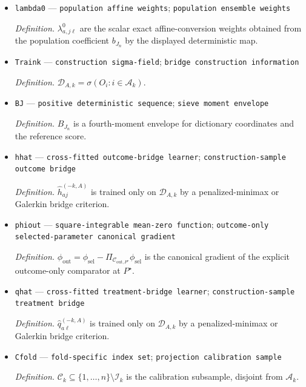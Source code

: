 \documentclass{article}
\begin{document}
\begin{itemize}
  \item \texttt{lambda0} --- \texttt{population affine weights}; \texttt{population ensemble weights}
  \par\smallskip\noindent\emph{Definition.} \(\lambda^0_{a,j\ell}\) are the scalar exact affine-conversion weights obtained from the population coefficient \(b_{J_n}\) by the displayed deterministic map.
  \item \texttt{Traink} --- \texttt{construction sigma-\allowbreak{}field}; \texttt{bridge construction information}
  \par\smallskip\noindent\emph{Definition.} \(\mathcal D_{A,k}=\sigma(O_i:i\in\mathcal A_k)\).
  \item \texttt{BJ} --- \texttt{positive deterministic sequence}; \texttt{sieve moment envelope}
  \par\smallskip\noindent\emph{Definition.} \(B_{J_n}\) is a fourth-moment envelope for dictionary coordinates and the reference score.
  \item \texttt{hhat} --- \texttt{cross-\allowbreak{}fitted outcome-\allowbreak{}bridge learner}; \texttt{construction-\allowbreak{}sample outcome bridge}
  \par\smallskip\noindent\emph{Definition.} \(\widehat h_{aj}^{(-k,A)}\) is trained only on \(\mathcal D_{A,k}\) by a penalized-minimax or Galerkin bridge criterion.
  \item \texttt{phiout} --- \texttt{square-\allowbreak{}integrable mean-\allowbreak{}zero function}; \texttt{outcome-\allowbreak{}only selected-\allowbreak{}parameter canonical gradient}
  \par\smallskip\noindent\emph{Definition.} \(\phi_{\mathrm{out}}=\phi_{\mathrm{sel}}-\Pi_{\mathcal C_{\mathrm{out},P^\star}}\phi_{\mathrm{sel}}\) is the canonical gradient of the explicit outcome-only comparator at \(P^\star\).
  \item \texttt{qhat} --- \texttt{cross-\allowbreak{}fitted treatment-\allowbreak{}bridge learner}; \texttt{construction-\allowbreak{}sample treatment bridge}
  \par\smallskip\noindent\emph{Definition.} \(\widehat q_{a\ell}^{(-k,A)}\) is trained only on \(\mathcal D_{A,k}\) by a penalized-minimax or Galerkin bridge criterion.
  \item \texttt{Cfold} --- \texttt{fold-\allowbreak{}specific index set}; \texttt{projection calibration sample}
  \par\smallskip\noindent\emph{Definition.} \(\mathcal C_k\subseteq\{1,\ldots,n\}\setminus\mathcal I_k\) is the calibration subsample, disjoint from \(\mathcal A_k\).

\end{itemize}
\end{document}
